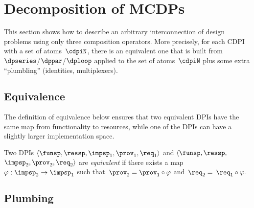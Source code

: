 

\section{Decomposition of MCDPs\label{sec:Decomposition}}

\label{sec:Decomposing2}This section shows how to describe an arbitrary
interconnection of design problems using only three composition operators.
More precisely, for each CDPI with a set of atoms~$\cdpiN$, there
is an equivalent one that is built from $\dpseries$/$\dppar$/$\dploop$
applied to the set of atoms~$\cdpiN$ plus some extra ``plumbling''
(identities, multiplexers).

\subsection{Equivalence}

The definition of equivalence below ensures that two equivalent DPIs
have the same map from functionality to resources, while one of the
DPIs can have a slightly larger implementation space.
\begin{definition}
  Two DPIs $\left\langle \funsp,\ressp,\impsp_{1},\prov_{1},\req_{1}\right\rangle $
  and $\langle\funsp,\ressp,$ $\impsp_{2},\prov_{2},\req_{2}\rangle$
  are \emph{equivalent} if there exists a map~$\varphi:\impsp_{2}\rightarrow\impsp_{1}$
  such that~$\prov_{2}=\prov_{1}\circ\varphi$ and~$\req_{2}=$ $\req_{1}\circ\varphi$.
\end{definition}

\subsection{Plumbing}


